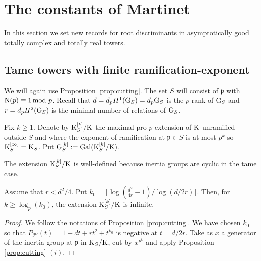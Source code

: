 \documentclass[12pt,a4paper,twoside,english]{smfart}
\def\p{{\mathfrak p}}
\def\N{{\rm N}}
\def\G{{\rm G}}
\def\K{{\rm K}}
\def\PP{{\mathcal P}}
\def\Gal{{\rm Gal}}
\begin{document}




\section{The constants of Martinet}
In this section we set new records for root discriminants in asymptotically good totally complex and totally real towers.

\subsection{Tame towers with finite ramification-exponent} 
We will  again use Proposition \ref{prop:cutting}. The set $S$ will consist of $\p$
 with $\N(\p) \equiv 1 \, {\rm mod} \ p$.  Recall that $d=d_p H^1(\G_S)=d_p \G_S$ is the $p$-rank of $\G_S$ and  $r=d_p H^2(\G_S)$ is the minimal  number of relations of $\G_S$.


\begin{defi} Fix $k\geq 1$.
Denote by $\K_S^{[k]}/\K$ the maximal pro-$p$ extension of $\K$ unramified outside $S$ and where the exponent  of ramification at $\p\in S$ is at most $p^{k}$
so $\K_S^{[\infty]} =\K_S$.
Put $\G_S^{[k]}:=\Gal(\K_S^{[k]}/\K)$.
\end{defi}

\begin{rema}
The extension $\K_S^{[k]}/\K$ is well-defined because  inertia  groups  are  cyclic in the tame case.
\end{rema}

\begin{prop} \label{prop;exponent}
Assume that $r<d^2/4 $. Put $k_0=\lceil  \log ( \frac{d^2}{4r}-1)/\log(d/2r)\rceil$.
 Then, for $k\geq \log_p(k_0)$, the extension $\K_S^{[k]}/\K$ is infinite.
\end{prop}

\begin{proof} 
We follow the notations of Proposition \ref{prop:cutting}.
We have chosen $k_0$ so that $P_{\PP'}(t) = 1-dt+rt^2+t^{k_0}$ is negative at $t=d/2r$. 
Take as  $x$ a generator of the inertia group  at $\p$ in $\K_S/\K$, cut by $x^{p^k}$ and
apply Proposition \ref{prop:cutting} $(i)$.
\end{proof}
\end{document}
